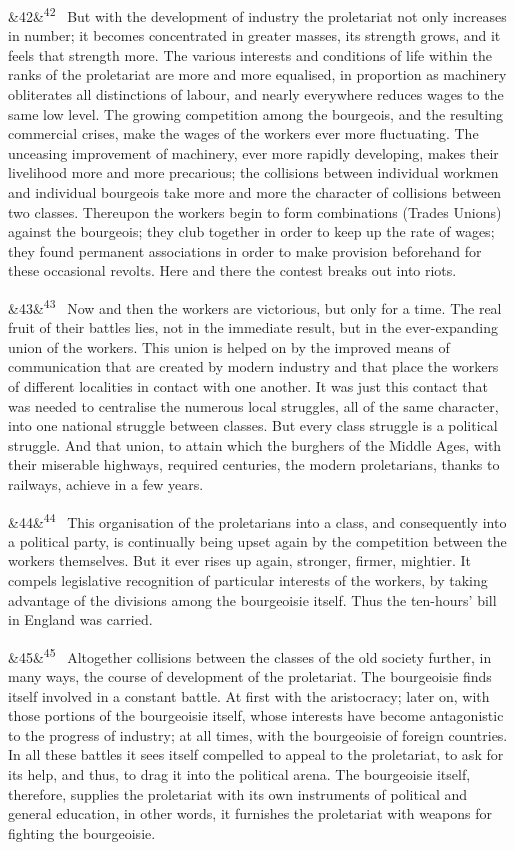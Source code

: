 \documentclass[12pt]{article}
\newcommand{\para}[1][]{\par\noindent\ifx&#1&\else\textsuperscript{\footnotesize #1}~\fi}
\begin{document}
\para[42] But with the development of industry the proletariat not only increases in number; it becomes concentrated in greater masses, its strength grows, and it feels that strength more. The various interests and conditions of life within the ranks of the proletariat are more and more equalised, in proportion as machinery obliterates all distinctions of labour, and nearly everywhere reduces wages to the same low level. The growing competition among the bourgeois, and the resulting commercial crises, make the wages of the workers ever more fluctuating. The unceasing improvement of machinery, ever more rapidly developing, makes their livelihood more and more precarious; the collisions between individual workmen and individual bourgeois take more and more the character of collisions between two classes. Thereupon the workers begin to form combinations (Trades Unions) against the bourgeois; they club together in order to keep up the rate of wages; they found permanent associations in order to make provision beforehand for these occasional revolts. Here and there the contest breaks out into riots.

\para[43] Now and then the workers are victorious, but only for a time. The real fruit of their battles lies, not in the immediate result, but in the ever-expanding union of the workers. This union is helped on by the improved means of communication that are created by modern industry and that place the workers of different localities in contact with one another. It was just this contact that was needed to centralise the numerous local struggles, all of the same character, into one national struggle between classes. But every class struggle is a political struggle. And that union, to attain which the burghers of the Middle Ages, with their miserable highways, required centuries, the modern proletarians, thanks to railways, achieve in a few years.

\para[44] This organisation of the proletarians into a class, and consequently into a political party, is continually being upset again by the competition between the workers themselves. But it ever rises up again, stronger, firmer, mightier. It compels legislative recognition of particular interests of the workers, by taking advantage of the divisions among the bourgeoisie itself. Thus the ten-hours' bill in England was carried.

\para[45] Altogether collisions between the classes of the old society further, in many ways, the course of development of the proletariat. The bourgeoisie finds itself involved in a constant battle. At first with the aristocracy; later on, with those portions of the bourgeoisie itself, whose interests have become antagonistic to the progress of industry; at all times, with the bourgeoisie of foreign countries. In all these battles it sees itself compelled to appeal to the proletariat, to ask for its help, and thus, to drag it into the political arena. The bourgeoisie itself, therefore, supplies the proletariat with its own instruments of political and general education, in other words, it furnishes the proletariat with weapons for fighting the bourgeoisie.
\end{document}
